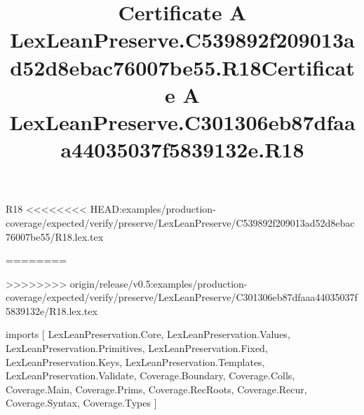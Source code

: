 \begin{lexlean}{R18}
<<<<<<<< HEAD:examples/production-coverage/expected/verify/preserve/LexLeanPreserve/C539892f209013ad52d8ebac76007be55/R18.lex.tex
\title{Certificate A LexLeanPreserve.C539892f209013ad52d8ebac76007be55.R18}
========
\title{Certificate A LexLeanPreserve.C301306eb87dfaaa44035037f5839132e.R18}
>>>>>>>> origin/release/v0.5:examples/production-coverage/expected/verify/preserve/LexLeanPreserve/C301306eb87dfaaa44035037f5839132e/R18.lex.tex
\begin{coremodule}
imports [
  LexLeanPreservation.Core,
  LexLeanPreservation.Values,
  LexLeanPreservation.Primitives,
  LexLeanPreservation.Fixed,
  LexLeanPreservation.Keys,
  LexLeanPreservation.Templates,
  LexLeanPreservation.Validate,
  Coverage.Boundary,
  Coverage.Colls,
  Coverage.Main,
  Coverage.Prims,
  Coverage.RecRoots,
  Coverage.Recur,
  Coverage.Syntax,
  Coverage.Types
]


\end{coremodule}
\end{lexlean}
